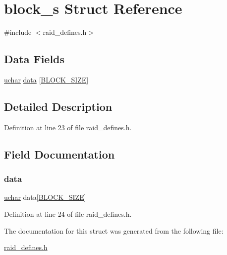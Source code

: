 \hypertarget{structblock__s}{}\section{block\+\_\+s Struct Reference}
\label{structblock__s}


{\ttfamily \#include $<$raid\+\_\+defines.\+h$>$}

\subsection*{Data Fields}
\begin{DoxyCompactItemize}
\item 
\hyperlink{raid__defines_8h_a65f85814a8290f9797005d3b28e7e5fc}{uchar} \hyperlink{structblock__s_aeb657a9749b851021c3ef39acaf7b252}{data} \mbox{[}\hyperlink{raid__defines_8h_ad51ded0bbd705f02f73fc60c0b721ced}{B\+L\+O\+C\+K\+\_\+\+S\+I\+ZE}\mbox{]}
\end{DoxyCompactItemize}


\subsection{Detailed Description}


Definition at line 23 of file raid\+\_\+defines.\+h.



\subsection{Field Documentation}
\mbox{\label{structblock__s_aeb657a9749b851021c3ef39acaf7b252}} 
\subsubsection{\texorpdfstring{data}{data}}
{\footnotesize\ttfamily \hyperlink{raid__defines_8h_a65f85814a8290f9797005d3b28e7e5fc}{uchar} data\mbox{[}\hyperlink{raid__defines_8h_ad51ded0bbd705f02f73fc60c0b721ced}{B\+L\+O\+C\+K\+\_\+\+S\+I\+ZE}\mbox{]}}



Definition at line 24 of file raid\+\_\+defines.\+h.



The documentation for this struct was generated from the following file\+:\begin{DoxyCompactItemize}
\item 
\hyperlink{raid__defines_8h}{raid\+\_\+defines.\+h}\end{DoxyCompactItemize}

